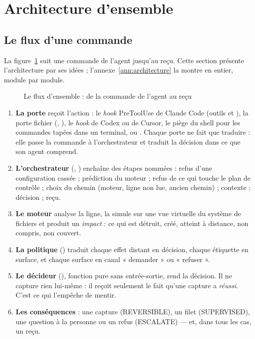 \section{Architecture d'ensemble}
\label{sec:architecture}

\subsection{Le flux d'une commande}
La figure~\ref{fig:flux} suit une commande de l'agent jusqu'au reçu. Cette section présente
l'architecture par ses idées ; l'annexe~\ref{ann:architecture} la montre en entier, module par
module.

\begin{figure}[htbp]
\centering

\caption{Le flux d'ensemble : de la commande de l'agent au reçu}
\label{fig:flux}
\end{figure}

\begin{enumerate}
  \item \textbf{La porte} reçoit l'action : le \textit{hook} PreToolUse de Claude Code (outils
     et ), la porte fichier (, ), le
    \textit{hook} de Codex ou de Cursor, le piège du shell pour les commandes tapées dans un
    terminal, ou . Chaque porte ne fait que traduire : elle passe la
    commande à l'orchestrateur et traduit la décision dans ce que son agent comprend.
  \item \textbf{L'orchestrateur} (, ) enchaîne des
    étapes nommées : refus d'une configuration cassée ; prédiction du moteur ; refus de ce
    qui touche le plan de contrôle ; choix du chemin (moteur, ligne non lue, ancien chemin) ;
    contexte ; décision ; reçu.
  \item \textbf{Le moteur} analyse la ligne, la simule sur une vue virtuelle du système de
    fichiers et produit un \emph{impact} : ce qui est détruit, créé, atteint à distance, non
    compris, non couvert.
  \item \textbf{La politique} () traduit chaque effet distant en
    décision, chaque étiquette en surface, et chaque surface en canal « demander » ou
    « refuser ».
  \item \textbf{Le décideur} (), fonction pure sans entrée-sortie, rend la
    décision. Il ne capture rien lui-même : il reçoit seulement le fait qu'une capture a
    \emph{réussi}. C'est ce qui l'empêche de mentir.
  \item \textbf{Les conséquences} : une capture (REVERSIBLE), un filet (SUPERVISED), une
    question à la personne ou un refus (ESCALATE) --- et, dans tous les cas, un reçu.
\end{enumerate}

